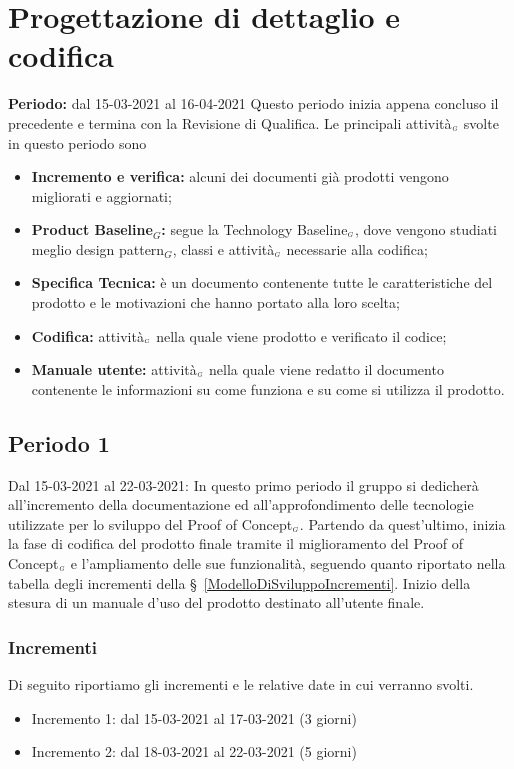 \section{Progettazione di dettaglio e codifica}\label{PianificazioneProgettazioneDettaglio}
\textbf{Periodo:} dal 15-03-2021 al 16-04-2021
Questo periodo inizia appena concluso il precedente e termina con la Revisione di Qualifica.
Le principali attività$_{\scaleto{G}{3pt}}$ svolte in questo periodo sono
\begin{itemize}
	\item \textbf{Incremento e verifica:} alcuni dei documenti già prodotti vengono migliorati e aggiornati;
	\item \textbf{Product Baseline$_G$:} segue la Technology Baseline$_{\scaleto{G}{3pt}}$, dove vengono studiati meglio design pattern$_G$, classi e attività$_{\scaleto{G}{3pt}}$ necessarie alla codifica;
	\item \textbf{Specifica Tecnica:} è un documento contenente tutte le caratteristiche del prodotto e le motivazioni che hanno portato alla loro scelta;
	\item \textbf{Codifica:} attività$_{\scaleto{G}{3pt}}$ nella quale viene prodotto e verificato il codice;
	\item \textbf{Manuale utente:} attività$_{\scaleto{G}{3pt}}$ nella quale viene redatto il documento contenente le informazioni su come funziona e su come si utilizza il prodotto.
\end{itemize}
\subsection{Periodo 1}\label{PianificazioneProgettazioneDettaglioPeriodo1}
Dal 15-03-2021 al 22-03-2021: In questo primo periodo il gruppo si dedicherà all'incremento della documentazione ed all'approfondimento delle tecnologie utilizzate per lo sviluppo del Proof of Concept$_{\scaleto{G}{3pt}}$. Partendo da quest'ultimo, inizia la fase di codifica del prodotto finale tramite il miglioramento del Proof of Concept$_{\scaleto{G}{3pt}}$ e l'ampliamento delle sue funzionalità, seguendo quanto riportato nella tabella degli incrementi della \S~\ref{ModelloDiSviluppoIncrementi}. Inizio della stesura di un manuale d'uso del prodotto destinato all'utente finale.
\subsubsection{Incrementi}\label{PianificazioneProgettazioneDettaglioPeriodo1Incrementi}
Di seguito riportiamo gli incrementi e le relative date in cui verranno svolti.
\begin{itemize}
	\item Incremento 1: dal 15-03-2021 al 17-03-2021 (3 giorni)
	\item Incremento 2: dal 18-03-2021 al 22-03-2021 (5 giorni)
\end{itemize}
